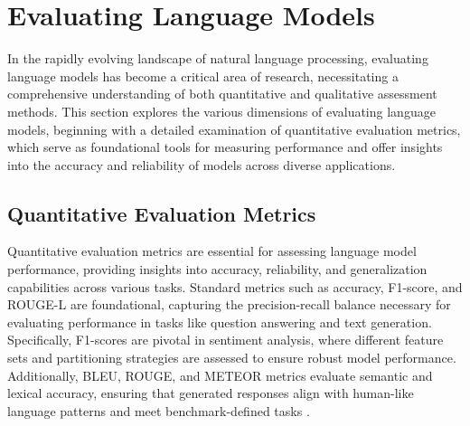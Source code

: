 















\section{Evaluating Language Models} \label{sec:Evaluating Language Models}

In the rapidly evolving landscape of natural language processing, evaluating language models has become a critical area of research, necessitating a comprehensive understanding of both quantitative and qualitative assessment methods. This section explores the various dimensions of evaluating language models, beginning with a detailed examination of quantitative evaluation metrics, which serve as foundational tools for measuring performance and offer insights into the accuracy and reliability of models across diverse applications.


\subsection{Quantitative Evaluation Metrics} \label{subsec:Quantitative Evaluation Metrics}

Quantitative evaluation metrics are essential for assessing language model performance, providing insights into accuracy, reliability, and generalization capabilities across various tasks. Standard metrics such as accuracy, F1-score, and ROUGE-L are foundational, capturing the precision-recall balance necessary for evaluating performance in tasks like question answering and text generation. Specifically, F1-scores are pivotal in sentiment analysis, where different feature sets and partitioning strategies are assessed to ensure robust model performance. Additionally, BLEU, ROUGE, and METEOR metrics evaluate semantic and lexical accuracy, ensuring that generated responses align with human-like language patterns and meet benchmark-defined tasks \cite{yamshchikov2020styletransferparaphraselookingsensible}.

